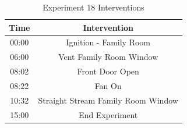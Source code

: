 \documentclass{article}
\begin{document}
\begin{table}[H]
	\centering
	\caption{Experiment 18 Interventions}
	\begin{tabular}{|c|c|} 
		\hline
		Time & Intervention \\ \hline \hline
		00:00 & Ignition - Family Room \\ \hline
		06:00 & Vent Family Room Window \\ \hline
		08:02 & Front Door Open \\ \hline
		08:22 & Fan On \\ \hline
		10:32 & Straight Stream Family Room Window \\ \hline
		15:00 & End Experiment \\ \hline
	\end{tabular}
	\label{Table:Exp18Interventions}
\end{table}

\clearpage
\end{document}
